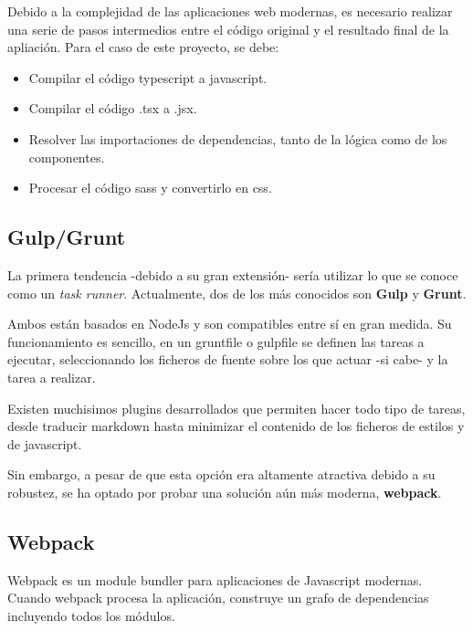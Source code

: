 Debido a la complejidad de las aplicaciones web modernas, es necesario 
realizar una serie de pasos intermedios entre el código original y 
el resultado final de la apliación. Para el caso de este proyecto, se debe:

\begin{itemize}

\item Compilar el código typescript a javascript.

\item Compilar el código .tsx a .jsx.

\item Resolver las importaciones de dependencias, tanto de la lógica
como de los componentes.

\item Procesar el código sass y convertirlo en css.

\end{itemize}

\subsection{Gulp/Grunt}

La primera tendencia -debido a su gran extensión- sería utilizar 
lo que se conoce como un \textit{task runner}. Actualmente, dos de los 
más conocidos son \textbf{Gulp} y \textbf{Grunt}.

\bigskip
Ambos están basados en NodeJs y son compatibles entre sí en gran medida.
Su funcionamiento es sencillo, en un gruntfile o gulpfile se definen las tareas a
ejecutar, seleccionando los ficheros de fuente sobre los que actuar -si cabe- y la tarea 
a realizar.

\bigskip
Existen muchisimos plugins desarrollados que permiten hacer todo tipo de tareas, desde traducir
markdown hasta minimizar el contenido de los ficheros de estilos y de javascript.

\bigskip
Sin embargo, a pesar de que esta opción era altamente atractiva debido 
a su robustez, se ha optado por probar una solución aún más moderna, \textbf{webpack}.

\subsection{Webpack}

Webpack es un module bundler para aplicaciones de Javascript modernas.
Cuando webpack procesa la aplicación, construye un grafo de dependencias
incluyendo todos los módulos.

